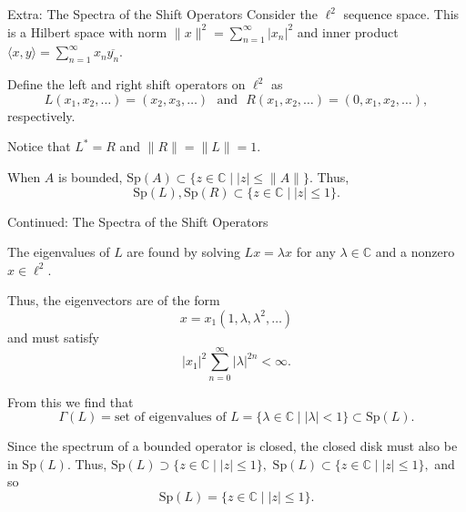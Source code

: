 \documentclass[aspectratio=169]{beamer}
\begin{document}
\begin{frame}{Extra: The Spectra of the Shift Operators}
    Consider the $\ell^2$ sequence space. This is a Hilbert space with norm $\| x \|^2 = \sum_{n=1}^{\infty} |x_n|^2$ and inner product $\langle x, y \rangle = \sum_{n=1}^{\infty} x_n \overline{y_n}.$

    \vspace{1em}

    Define the left and right shift operators on $\ell^2$ as 
    $$ L(x_1, x_2, \dots) = (x_2, x_3, \dots) \,\, \text{ and } \,\, R(x_1, x_2, \dots) = (0, x_1, x_2, \dots),$$
    respectively.

    \vspace{1em}
     
    Notice that $L^* = R$ and $\| R \| = \|L\| = 1.$

    \vspace{1em}

        When $A$ is bounded,
     $\text{Sp}(A) \subset \{ z \in \mathbb{C} \mid |z| \le \|A\| \}.$
    Thus,
     $$ \text{Sp}(L),  \text{Sp}(R) \subset \{ z \in \mathbb{C} \mid |z| \le 1 \}.$$
    
\end{frame}





\begin{frame}{Continued: The Spectra of the Shift Operators}

    The eigenvalues of $L$ are found by solving $Lx = \lambda x$ for any $\lambda \in \mathbb{C}$ and a nonzero $x \in \ell^2.$

     \vspace{0.5em}

    Thus, the eigenvectors are of the form
    $$ x = x_1 (1, \lambda, \lambda^2, \dots)$$
    and must satisfy
    $$ |x_1|^2 \sum_{n=0}^{\infty} |\lambda|^{2n} < \infty.$$


 From this we find that
    $$\Gamma(L) = \text{set of eigenvalues of } L = \{ \lambda \in \mathbb{C} \mid |\lambda| < 1 \} \subset \text{Sp}(L).$$

     \vspace{0.5em}

    Since the spectrum of a bounded operator is closed, the closed disk must also be in $\text{Sp}(L).$ Thus,  $ \text{Sp}(L) \supset \{ z \in \mathbb{C} \mid |z| \le 1 \},$  $ \text{Sp}(L) \subset \{ z \in \mathbb{C} \mid |z| \le 1 \},$ and so
     $$ \text{Sp}(L) = \{ z \in \mathbb{C} \mid |z| \le 1 \}.$$

\end{frame}
\end{document}
